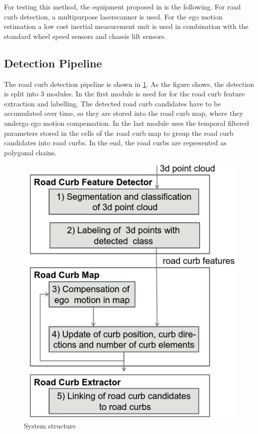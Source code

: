 For testing this method, the equipment proposed in \cite{lidar13} is the following. For road curb detection, a multipurpose laserscanner is used. For the ego motion estimation a low cost inertial measurement unit is used in combination with the standard wheel speed sensors and chassis lift sensors. 

\subsection{Detection Pipeline}

The road curb detection pipeline is shown in \ref{fig1}. As the figure shows, the detection is split into 3 modules. In the first module is used for for the road curb feature extraction and labelling. The detected road curb candidates have to be accumulated over time, so they are stored into the road curb map, where they undergo ego motion compensation. In the last module uses the temporal filtered parameters stored in the cells of the road curb map to group the road curb candidates into road curbs. In the end, the road curbs are represented as polygonal chains.  

\begin{figure}[ht]
	\centering
    \includegraphics[scale = 0.5]{pictures/system_structure.pdf}
	\caption{System structure \cite{lidar13}}
	\label{fig1}
\end{figure}
  
